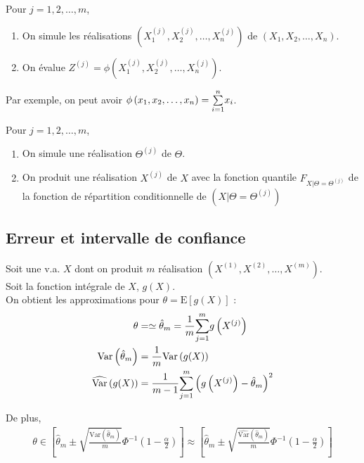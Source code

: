 \documentclass[10pt, french]{article}
\begin{document}
\begin{multicols*}{2}
\begin{algo2}
Pour $j	=	1, 2, \dots, m$, 
\begin{enumerate}
	\item	On simule les réalisations $\left(X_{1}^{(j)}, X_{2}^{(j)}, \dots, X_{n}^{(j)}\right)$ de $\left(X_{1}, X_{2}, \dots, X_{n}\right)$.
	\item	On évalue $Z^{(j)}	=	\phi\left(X_{1}^{(j)}, X_{2}^{(j)}, \dots, X_{n}^{(j)}\right)$.
\end{enumerate}

Par exemple, on peut avoir $\phi\left(x_{1}, x_{2}, \dots, x_{n}\right)	=	\overset{n}{\underset{i = 1}{\sum}}x_{i}$.
\end{algo2}

\begin{algo2}
Pour $j	=	1, 2, \dots, m$, 
\begin{enumerate}
	\item	On simule une réalisation $\Theta^{(j)}$ de $\Theta$.
	\item	On produit une réalisation $X^{(j)}$ de $X$ avec la fonction quantile $F_{X | \Theta = \Theta^{(j)}}$ de la fonction de répartition conditionnelle de $(X | \Theta = \Theta^{(j)})$
\end{enumerate}
\end{algo2}

\subsection{Erreur et intervalle de confiance}
Soit une v.a. $X$ dont on produit $m$ réalisation $\left( X^{(1)}, X^{(2)}, \dots, X^{(m)} \right)$.\\
Soit la fonction intégrale de $X$, $g(X)$.\\
On obtient les approximations pour $\theta	=	\text{E}[g(X)]$ : 
\begin{align*}
	\theta	
	&=	\simeq	\hat{\theta}_{m}
	=	\frac{1}{m}\overset{m}{\underset{j	=	1}{\sum}} g\left(X^{(j)}\right)	\\
	\text{Var}\left(\hat{\theta}_{m}\right)
	&=	\frac{1}{m}\text{Var}\left(g(X)\right)	\\
	\widehat{\text{Var}}\left(g(X)\right)
	&=	\frac{1}{m - 1} \overset{m}{\underset{j	=	1}{\sum}} \left(g\left(X^{(j)}\right)	-	\hat{\theta}_{m}\right)^{2}
\end{align*}

De plus, 
\begin{align*}
	\theta \in \left[\hat{\theta}_{m} \pm \sqrt{\frac{\text{Var}\left(\hat{\theta}_{m}\right)}{m}} \Phi^{-1} \left(1 - \frac{\alpha}{2}\right)\right]
	\approx	\left[\hat{\theta}_{m} \pm \sqrt{\frac{\widehat{\text{Var}}\left(\hat{\theta}_{m}\right)}{m}} \Phi^{-1} \left(1 - \frac{\alpha}{2}\right)\right]
\end{align*}


\end{multicols*}
\end{document}

